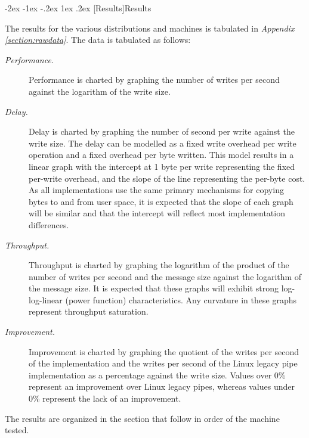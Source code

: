 \documentclass[letterpaper,final,notitlepage,twocolumn,10pt,twoside]{article}
\makeatletter
\renewcommand\section{\@startsection {section}{1}{\z@}%
                                   {-2ex \@plus -1ex \@minus -.2ex}%
                                   {1ex \@plus .2ex}%
                                   {\normalfont\large\bfseries}}
\makeatother
\begin{document}
\section[Results]{Results}

The results for the various distributions and machines is tabulated in \textit{Appendix
\ref{section:rawdata}}.  The data is tabulated as follows:

\begin{description}

\item[{\it Performance.}]

Performance is charted by graphing the number of writes per second against the logarithm of the
write size.

\item[{\it Delay.}]

Delay is charted by graphing the number of second per write against the write size.  The delay can
be modelled as a fixed write overhead per write operation and a fixed overhead per byte written.
This model results in a linear graph with the intercept at 1 byte per write representing the fixed
per-write overhead, and the slope of the line representing the per-byte cost.  As all
implementations use the same primary mechanisms for copying bytes to and from user space, it is
expected that the slope of each graph will be similar and that the intercept will reflect most
implementation differences.

\item[{\it Throughput.}]

Throughput is charted by graphing the logarithm of the product of the number of writes per second
and the message size against the logarithm of the message size.  It is expected that these graphs
will exhibit strong log-log-linear (power function) characteristics.  Any curvature in these graphs
represent throughput saturation.

\item[{\it Improvement.}]

Improvement is charted by graphing the quotient of the writes per second of the implementation and
the writes per second of the Linux legacy pipe implementation as a percentage against the write
size.  Values over 0\% represent an improvement over Linux legacy pipes, whereas values under 0\%
represent the lack of an improvement.

\end{description}

The results are organized in the section that follow in order of the machine tested.
\end{document}
